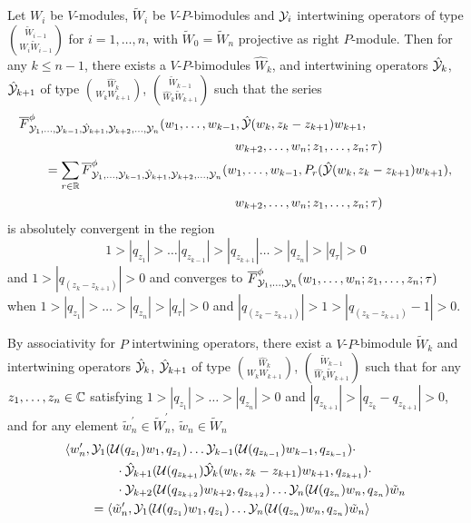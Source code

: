 \documentclass[12pt]{article}
\begin{document}
\begin{prop}
  Let $W_i$ be $V$-modules, $\tilde W_i$ be $V$-$P$-bimodules
  and $\mathcal{Y}_i$ intertwining operators of type
  $\binom{\tilde W_{i-1}}{W_i \tilde W_{i-1}}$ for $i=1,\ldots, n$,
  with $\tilde W_0 = \tilde W_n$ projective as right $P$-module.
  Then for any $k\leq n-1$, there exists a $V$-$P$-bimodules $\hat W_k$,
  and intertwining operators $\hat {\mathcal{Y}}_k$, $\hat {\mathcal{Y}}_{k+1}$
  of type $\binom{\hat W_k}{W_k W_{k+1}}$,
  $\binom{\tilde W_{k-1}}{\hat W_k \tilde W_{k+1}}$ such that the series
  \begin{align*}
    &\overline
    F^\phi_{\Y_1, \ldots, \Y_{k-1}, \hat\Y_{k+1},\Y_{k+2},\ldots, \Y_n}
      (w_1,\ldots, w_{k-1}, \hat \Y(w_k,z_k - z_{k+1})w_{k+1}, \\
      &\hspace{6cm} w_{k+2}, \ldots, w_n;z_1, \ldots, z_n; \tau)\\
    &\qquad  = \sum_{r\in \R}\overline F^\phi_{\Y_1, \ldots, \Y_{k-1},
      \hat\Y_{k+1},\Y_{k+2},\ldots, \Y_n}
      (w_1,\ldots, w_{k-1}, P_r(\hat \Y(w_k,z_k - z_{k+1})w_{k+1}), \\
      &\hspace{6cm} w_{k+2}, \ldots, w_n;z_1, \ldots, z_n; \tau)
  \end{align*}
  is absolutely convergent in the region
  $$
    1 > |q_{z_1}| > \ldots |q_{z_{k-1}}| > |q_{z_{k+1}}|
    \ldots > |q_{z_{n}}| > |q_{\tau}| > 0
  $$
  and $ 1 > |q_{(z_{k} - z_{k+1})}| > 0$ and converges to
  $\overline F^\phi_{\mathcal{Y}_1, \ldots, \mathcal{Y}_n}(w_1,\ldots, w_n;
  z_1, \ldots, z_n; \tau)$ when $1 > |q_{z_1}| > 
    \ldots > |q_{z_{n}}| > |q_{\tau}| > 0$ and 
    $|q_{(z_{k} - z_{k+1})}| > 1 > |q_{(z_{k} - z_{k+1})}-1| > 0$.
\end{prop}
\proof 
  By associativity for $P$ intertwining operators, there exist a
  $V$-$P$-bimodule $\tilde W_k$ and intertwining operators 
  $\hat {\mathcal{Y}}_k$, $\hat {\mathcal{Y}}_{k+1}$
  of type $\binom{\hat W_k}{W_k W_{k+1}}$,
  $\binom{\tilde W_{k-1}}{\hat W_k \tilde W_{k+1}}$ such that
  for any $z_1,\ldots, z_n \in \mathbb{C}$ satisfying $1> |q_{z_1}| >
  \ldots > |q_{z_n}| > 0$ and
  $|q_{z_{k+1}}| > |q_{z_k} - q_{z_{k+1}}| > 0$,
  and for any element $\tilde w_n^\prime\in \tilde W_n^\prime$,
  $\tilde w_n\in \tilde W_n$
  \begin{align*}
    &\langle w_n^\prime, \mathcal{Y}_{1}(\mathcal{U}(q_{z_{1}})w_{1}, q_{z_{1}})\ldots \mathcal{Y}_{k-1}(\mathcal{U}(q_{z_{k-1}})w_{k-1}, q_{z_{k-1}})\cdot\\
    & \qquad \qquad \cdot
      \hat {\mathcal{Y}}_{k+1}(\mathcal{U}(q_{z_{k+1}})
      \hat {\mathcal{Y}}_k(w_k, z_k - z_{k+1})w_{k+1}, q_{z_{k+1}})\cdot\\
    &\qquad\qquad \cdot  \mathcal{Y}_{k+2}(\mathcal{U}(q_{z_{k+2}})w_{k+2}, q_{z_{k+2}})\ldots \mathcal{Y}_{n}(\mathcal{U}(q_{z_{n}})w_{n}, q_{z_{n}})\tilde w_n\\
    &\qquad = \langle \tilde w_n^\prime, \mathcal{Y}_{1}(\mathcal{U}(q_{z_{1}})w_{1}, q_{z_{1}})\ldots \mathcal{Y}_{n}(\mathcal{U}(q_{z_{n}})w_{n}, q_{z_{n}})
      \tilde w_n \rangle
  \end{align*}
\end{document}
